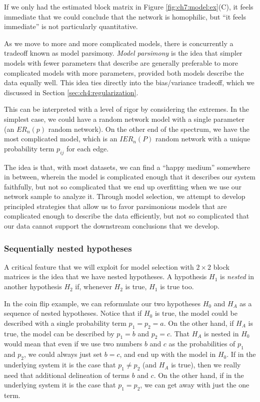 If we only had the estimated block matrix in Figure \ref{fig:ch7:model:ex}(C), it feels immediate that we could conclude that the network is homophilic, but ``it feels immediate'' is not particularly quantitative.

As we move to more and more complicated models, there is concurrently a tradeoff known as model parsimony. \textit{Model parsimony} is the idea that simpler models with fewer parameters that describe are generally preferable to more complicated models with more parameters, provided both models describe the data equally well. This idea ties directly into the bias/variance tradeoff, which we discussed in Section \ref{sec:ch4:regularization}.

This can be interpreted with a level of rigor by considering the extremes. In the simplest case, we could have a random network model with a single parameter (an $ER_n(p)$ random network). On the other end of the spectrum, we have the most complicated model, which is an $IER_n(P)$ random network with a unique probability term $p_{ij}$ for each edge. 

The idea is that, with most datasets, we can find a ``happy medium'' somewhere in between, wherein the model is complicated enough that it describes our system faithfully, but not so complicated that we end up overfitting when we use our network sample to analyze it. Through model selection, we attempt to develop principled strategies that allow us to favor parsimonious models that are complicated enough to describe the data efficiently, but not so complicated that our data cannot support the downstream conclusions that we develop. 

\subsubsection*{Sequentially nested hypotheses}

A critical feature that we will exploit for model selection with $2 \times 2$ block matrices is the idea that we have nested hypotheses. A hypothesis $H_1$ is \textit{nested} in another hypothesis $H_2$ if, whenever $H_2$ is true, $H_1$ is true too. 

In the coin flip example, we can reformulate our two hypotheses $H_0$ and $H_A$ as a sequence of nested hypotheses. Notice that if $H_0$ is true, the model could be described with a single probability term $p_1 = p_2 = a$. On the other hand, if $H_A$ is true, the model can be described by $p_1 = b$ and $p_2 = c$. That $H_A$ is nested in $H_0$ would mean that even if we use two numbers $b$ and $c$ as the probabilities of $p_1$ and $p_2$, we could always just set $b = c$, and end up with the model in $H_0$. If in the underlying system it is the case that $p_1 \neq p_2$ (and $H_A$ is true), then we really need that additional delineation of terms $b$ and $c$. On the other hand, if in the underlying system it is the case that $p_1 = p_2$, we can get away with just the one term. 

